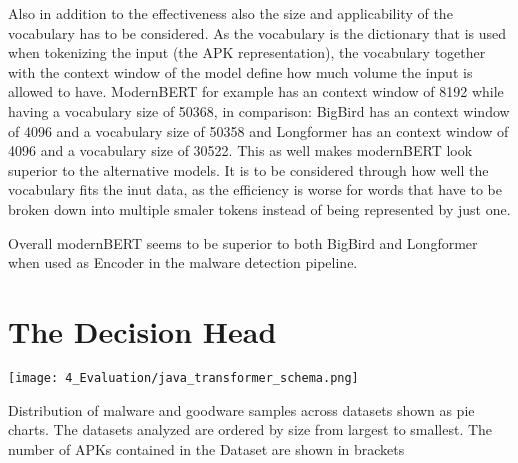 Also in addition to the effectiveness also the size and applicability of 
the vocabulary has to be considered. As the vocabulary is the dictionary that
is used when tokenizing the input (the APK representation), the vocabulary 
together with the context window of the model define how much volume the
input is allowed to have. ModernBERT for example has an context window of
8192 while having a vocabulary size of 50368, in comparison: BigBird has 
an context window of 4096 and a vocabulary size of 50358 and Longformer has
an context window of 4096 and a vocabulary size of 30522. This as well makes 
modernBERT look superior to the alternative models. It is to be considered through
how well the vocabulary fits the inut data, as the efficiency is worse for 
words that have to be broken down into multiple smaler tokens instead of being
represented by just one.

Overall modernBERT seems to be superior to both BigBird and Longformer when used as Encoder in 
the malware detection pipeline.


\begin{table}[t] 
    \caption{\label{tab:encoder_model_comparison_cls}%
    Performance comparison of different encoder models for generating embeddings. The APK representation is fixed to Activities (A) and Permissions (P). The encoder was trained through backpropagation in this experiment. The transcenden subset was used as dataset. The embedding of the CLS token was used as APK embedding.}    
\end{table}


\newpage


\section{The Decision Head}

\begin{marginfigure}[3\baselineskip] %
    \center
    \texttt{[image: 4\_Evaluation/java\_transformer\_schema.png]}
    \caption{\label{fig:java_transformer_schema}
    Distribution of malware and goodware samples across datasets shown as pie charts.
    The datasets analyzed are ordered by size from largest to smallest.
    The number of APKs contained in the Dataset are shown in brackets}
\end{marginfigure}


